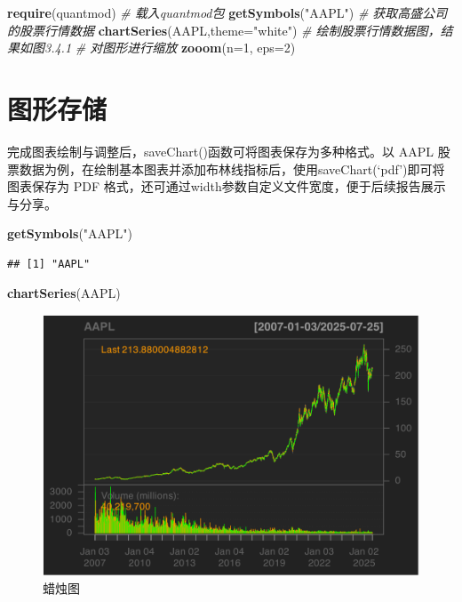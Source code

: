 \documentclass[]{ctexbook}
\newenvironment{Shaded}{\begin{snugshade}}{\end{snugshade}}
\newcommand{\AttributeTok}[1]{\textcolor[rgb]{0.13,0.29,0.53}{#1}}
\newcommand{\CommentTok}[1]{\textcolor[rgb]{0.56,0.35,0.01}{\textit{#1}}}
\newcommand{\DecValTok}[1]{\textcolor[rgb]{0.00,0.00,0.81}{#1}}
\newcommand{\FunctionTok}[1]{\textcolor[rgb]{0.13,0.29,0.53}{\textbf{#1}}}
\newcommand{\NormalTok}[1]{#1}
\newcommand{\StringTok}[1]{\textcolor[rgb]{0.31,0.60,0.02}{#1}}
\begin{document}
\begin{Shaded}
\begin{Highlighting}[]
\FunctionTok{require}\NormalTok{(quantmod) }\CommentTok{\# 载入quantmod包}
\FunctionTok{getSymbols}\NormalTok{(}\StringTok{"AAPL"}\NormalTok{)  }\CommentTok{\# 获取高盛公司的股票行情数据}
\FunctionTok{chartSeries}\NormalTok{(AAPL,}\AttributeTok{theme=}\StringTok{"white"}\NormalTok{)  }\CommentTok{\# 绘制股票行情数据图，结果如图3.4.1}
\CommentTok{\# 对图形进行缩放}
\FunctionTok{zooom}\NormalTok{(}\AttributeTok{n=}\DecValTok{1}\NormalTok{, }\AttributeTok{eps=}\DecValTok{2}\NormalTok{)    }
\end{Highlighting}
\end{Shaded}

\section{图形存储}\label{ux56feux5f62ux5b58ux50a8}

完成图表绘制与调整后，saveChart()函数可将图表保存为多种格式。以 AAPL 股票数据为例，在绘制基本图表并添加布林线指标后，使用saveChart(`pdf')即可将图表保存为 PDF 格式，还可通过width参数自定义文件宽度，便于后续报告展示与分享。

\begin{Shaded}
\begin{Highlighting}[]
\FunctionTok{getSymbols}\NormalTok{(}\StringTok{"AAPL"}\NormalTok{)}
\end{Highlighting}
\end{Shaded}

\begin{verbatim}
## [1] "AAPL"
\end{verbatim}

\begin{Shaded}
\begin{Highlighting}[]
\FunctionTok{chartSeries}\NormalTok{(AAPL)}
\end{Highlighting}
\end{Shaded}

\begin{figure}
\includegraphics[width=0.9\linewidth]{QuantmodHandbook_files/figure-latex/savePdf-1} \caption{蜡烛图}\label{fig:savePdf-1}
\end{figure}
\end{document}
